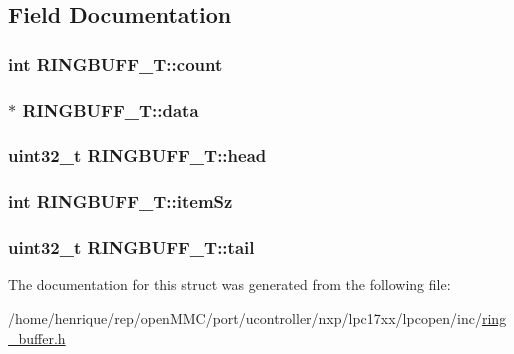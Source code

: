 \subsection{Field Documentation}
\hypertarget{structRINGBUFF__T_a87af72a615ed11d5c7000904a2fe5b4a}{
\subsubsection[{count}]{\setlength{\rightskip}{0pt plus 5cm}int R\-I\-N\-G\-B\-U\-F\-F\-\_\-\-T\-::count}}\label{structRINGBUFF__T_a87af72a615ed11d5c7000904a2fe5b4a}
\hypertarget{structRINGBUFF__T_a72858dc34b0dd618118388924c28967c}{
\subsubsection[{data}]{$\ast$ R\-I\-N\-G\-B\-U\-F\-F\-\_\-\-T\-::data}}\label{structRINGBUFF__T_a72858dc34b0dd618118388924c28967c}
\hypertarget{structRINGBUFF__T_a30c2ea59e510513e18bb22b4c783e6bb}{
\subsubsection[{head}]{\setlength{\rightskip}{0pt plus 5cm}uint32\-\_\-t R\-I\-N\-G\-B\-U\-F\-F\-\_\-\-T\-::head}}\label{structRINGBUFF__T_a30c2ea59e510513e18bb22b4c783e6bb}
\hypertarget{structRINGBUFF__T_a8d36d35edc73f36f7f81e98693ef3259}{
\subsubsection[{item\-Sz}]{\setlength{\rightskip}{0pt plus 5cm}int R\-I\-N\-G\-B\-U\-F\-F\-\_\-\-T\-::item\-Sz}}\label{structRINGBUFF__T_a8d36d35edc73f36f7f81e98693ef3259}
\hypertarget{structRINGBUFF__T_a490ce2de2b2e234beeafdb9f9298f20f}{
\subsubsection[{tail}]{\setlength{\rightskip}{0pt plus 5cm}uint32\-\_\-t R\-I\-N\-G\-B\-U\-F\-F\-\_\-\-T\-::tail}}\label{structRINGBUFF__T_a490ce2de2b2e234beeafdb9f9298f20f}


The documentation for this struct was generated from the following file\-:\begin{DoxyCompactItemize}
\item 
/home/henrique/rep/open\-M\-M\-C/port/ucontroller/nxp/lpc17xx/lpcopen/inc/\hyperlink{ring__buffer_8h}{ring\-\_\-buffer.\-h}\end{DoxyCompactItemize}
